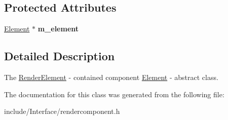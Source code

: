 \subsection*{Protected Attributes}
\begin{DoxyCompactItemize}
\item 
\hypertarget{classEngine_1_1RenderElement_a11af48bd094c96669b1a030335986d67}{}\hyperlink{classEngine_1_1Element}{Element} $\ast$ {\bfseries m\+\_\+element}\label{classEngine_1_1RenderElement_a11af48bd094c96669b1a030335986d67}

\end{DoxyCompactItemize}


\subsection{Detailed Description}
The \hyperlink{classEngine_1_1RenderElement}{Render\+Element} -\/ contained component \hyperlink{classEngine_1_1Element}{Element} -\/ abstract class. 

The documentation for this class was generated from the following file\+:\begin{DoxyCompactItemize}
\item 
include/\+Interface/rendercomponent.\+h\end{DoxyCompactItemize}
